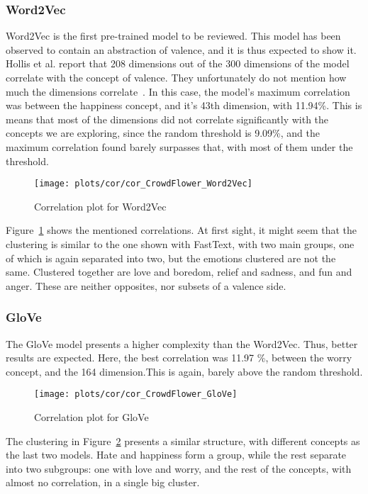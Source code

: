 \subsubsection{Word2Vec}
Word2Vec is the first pre-trained model to be reviewed. This model has been observed to contain an abstraction of valence, and it is thus expected to show it. Hollis et al. report that 208 dimensions out of the 300 dimensions of the model correlate with the concept of valence. They unfortunately do not mention how much the dimensions correlate~\cite{hollis2016principals}. In this case, the model's maximum correlation was between the happiness concept, and it's 43th dimension, with 11.94\%. This is means that most of the dimensions did not correlate significantly with the concepts we are exploring, since the random threshold is 9.09\%, and the maximum correlation found barely surpasses that, with most of them under the threshold.

\begin{figure}[H]
  \texttt{[image: plots/cor/cor\_CrowdFlower\_Word2Vec]}
  \centering
  \caption{Correlation plot for Word2Vec}\label{fig:cor_CrowdFlower_Word2Vec}
\end{figure}

Figure~\ref{fig:cor_CrowdFlower_Word2Vec} shows the mentioned correlations. At first sight, it might seem that the clustering is similar to the one shown with FastText, with two main groups, one of which is again separated into two, but the emotions clustered are not the same. Clustered together are love and boredom, relief and sadness, and fun and anger. These are neither opposites, nor subsets of a valence side.

\subsubsection{GloVe}
The GloVe model presents a higher complexity than the Word2Vec. Thus, better results are expected. Here, the best correlation was 11.97 \%, between the worry concept, and the 164 dimension.This is again, barely above the random threshold.
\begin{figure}[H]
  \texttt{[image: plots/cor/cor\_CrowdFlower\_GloVe]}
  \centering
  \caption{Correlation plot for GloVe}\label{fig:cor_CrowdFlower_GloVe}
\end{figure}
The clustering in Figure~\ref{fig:cor_CrowdFlower_GloVe} presents a similar structure, with different concepts as the last two models. Hate and happiness form a group, while the rest separate into two subgroups: one with love and worry, and the rest of the concepts, with almost no correlation, in a single big cluster.

